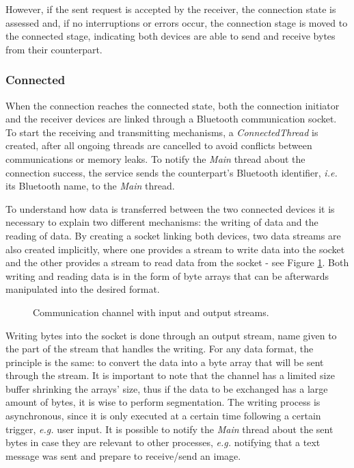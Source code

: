 However, if the sent request is accepted by the receiver, the connection state is assessed and, if no interruptions or errors occur, the connection stage is moved to the connected stage, indicating both devices are able to send and receive bytes from their counterpart.

\subsubsection{Connected}
\label{subsubsec:connected}

When the connection reaches the connected state, both the connection initiator and the receiver devices are linked through a Bluetooth communication socket. To start the receiving and transmitting mechanisms, a \textit{ConnectedThread} is created, after all ongoing threads are cancelled to avoid conflicts between communications or memory leaks. To notify the \textit{Main} thread about the connection success, the service sends the counterpart's Bluetooth identifier, \textit{i.e.} its Bluetooth name, to the \textit{Main} thread.

To understand how data is transferred between the two connected devices it is necessary to explain two different mechanisms: the writing of data and the reading of data. By creating a socket linking both devices, two data streams are also created implicitly, where one provides a stream to write data into the socket and the other provides a stream to read data from the socket - see Figure \ref{fig:inoutstreams}. Both writing and reading data is in the form of byte arrays that can be afterwards manipulated into the desired format.

\begin{figure}[ht]
	\noindent{}
	\caption{\label{fig:inoutstreams} Communication channel with input and output streams.}
\end{figure}

Writing bytes into the socket is done through an output stream, name given to the part of the stream that handles the writing. For any data format, the principle is the same: to convert the data into a byte array that will be sent through the stream. It is important to note that the channel has a limited size buffer shrinking the arrays' size, thus if the data to be exchanged has a large amount of bytes, it is wise to perform segmentation. The writing process is asynchronous, since it is only executed at a certain time following a certain trigger, \textit{e.g.} user input. It is possible to notify the \textit{Main} thread about the sent bytes in case they are relevant to other processes, \textit{e.g.} notifying that a text message was sent and prepare to receive/send an image.

